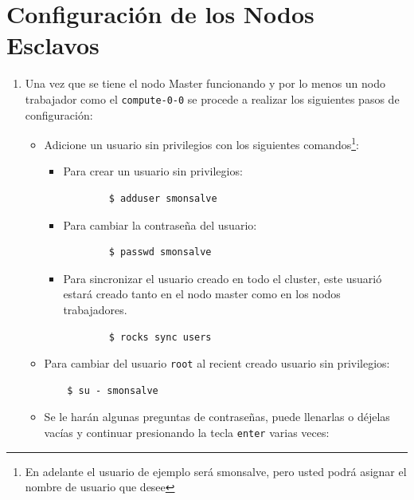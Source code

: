 \section{Configuración de los Nodos Esclavos}

\begin{enumerate}
	\item Una vez que se tiene el nodo Master funcionando y por lo menos un nodo trabajador como el \texttt{compute-0-0} se procede a realizar los siguientes pasos de configuración:

	\begin{itemize}
	\item Adicione un usuario sin privilegios con los siguientes comandos\footnote{En adelante el usuario de ejemplo será smonsalve, pero usted podrá asignar el nombre de usuario que desee}:

	\begin{itemize}
		\item  Para crear un usuario sin privilegios: 


		\begin{verbatim}
		$ adduser smonsalve
		\end{verbatim}
		
		\item Para cambiar la contraseña del usuario:


		\begin{verbatim}
		$ passwd smonsalve
		\end{verbatim}
		

		\item Para sincronizar el usuario creado en todo el cluster, este usuarió estará creado tanto en el nodo master como en los nodos trabajadores.


		\begin{verbatim}
		$ rocks sync users
		\end{verbatim}
		
	\end{itemize}

	\item Para cambiar del usuario \texttt{root} al recient creado usuario sin privilegios: 

	\begin{verbatim}
	$ su - smonsalve
	\end{verbatim}

	\item Se le harán algunas preguntas de contraseñas, puede llenarlas o déjelas vacías y continuar presionando la tecla \texttt{enter} varias veces: 

	\end{itemize}
	
\end{enumerate}

